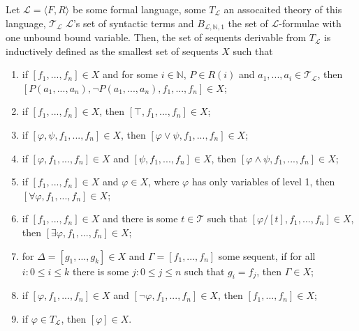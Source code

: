 \begin{definition}\label{def:seq-calc}
    \leanok
    Let $\mathcal{L} = \langle F,R \rangle$ be some formal language, some $T_{\mathcal{L}}$ an assocaited theory of this language, $\mathcal{T}_{\mathcal{L}}$ $\mathcal{L}$'s set of syntactic terms and $B_{\mathcal{L},\mathbb{N},1}$ the set of $\mathcal{L}$-formulae with one unbound bound variable. Then, the set of sequents derivable from $T_{\mathcal{L}}$ is inductively defined as the smallest set of sequents $X$ such that
    \begin{enumerate}
        \item if $[f_1,...,f_n] \in X$ and for some $i \in \mathbb{N}$, $P \in R(i)$ and $a_1,...,a_i \in \mathcal{T}_{\mathcal{L}}$, then \\ $[P(a_1,...,a_n),\neg P(a_1,...,a_n),f_1,...,f_n] \in X$;
        \item if $[f_1,...,f_n] \in X$, then $[\top,f_1,...,f_n] \in X$;
        \item if $[\varphi,\psi,f_1,...,f_n] \in X$, then $[\varphi \lor \psi,f_1,...,f_n] \in X$;
        \item if $[\varphi,f_1,...,f_n] \in X$ and $[\psi,f_1,...,f_n] \in X$, then $[\varphi \land \psi,f_1,...,f_n] \in X$;
        \item if $[f_1,...,f_n] \in X$ and $\varphi \in X$, where $\varphi$ has only variables of level 1, then $[\forall \varphi, f_1,...,f_n] \in X$;
        \item if $[f_1,...,f_n] \in X$ and there is some $t \in \mathcal{T}$ such that $[\varphi /[t],f_1,...,f_n] \in X$, then $[\exists \varphi, f_1,...,f_n] \in X$;
        \item for $\Delta = [g_1,...,g_k] \in X$ and $\Gamma = [f_1,...,f_n]$ some sequent, if for all $i: 0 \leq i \leq k$ there is some $j: 0 \leq j \leq n$ such that $g_i = f_j$, then $\Gamma \in X$;
        \item if $[\varphi,f_1,...,f_n] \in X$ and $[\neg \varphi,f_1,...,f_n] \in X$, then $[f_1,...,f_n] \in X$;
        \item if $\varphi \in T_{\mathcal{L}}$, then $[\varphi] \in X$. 
    \end{enumerate}
\end{definition}


